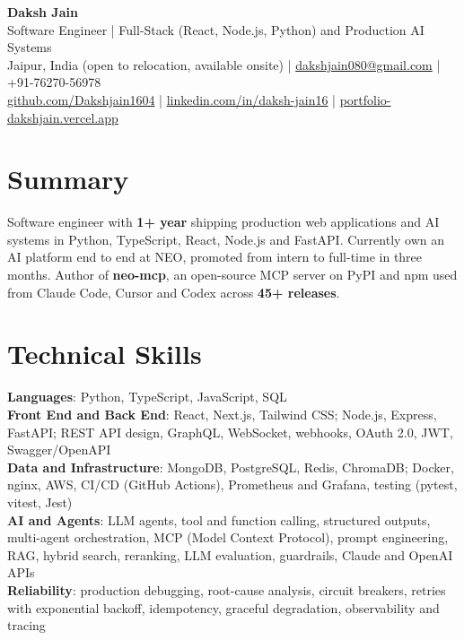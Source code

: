 \documentclass[10pt,letterpaper]{article}
\begin{document}
\begin{center}
  {\LARGE\bfseries Daksh Jain}\\[1pt]
  Software Engineer | Full-Stack (React, Node.js, Python) and Production AI Systems\\[1pt]
  Jaipur, India (open to relocation, available onsite) |
  \href{mailto:dakshjain080@gmail.com}{dakshjain080@gmail.com} |
  +91-76270-56978\\[1pt]
  \href{https://github.com/Dakshjain1604}{github.com/Dakshjain1604} |
  \href{https://linkedin.com/in/daksh-jain16}{linkedin.com/in/daksh-jain16} |
  \href{https://portfolio-dakshjain.vercel.app}{portfolio-dakshjain.vercel.app}
\end{center}

\section*{Summary}

Software engineer with \textbf{1+ year} shipping production web applications and AI systems in
Python, TypeScript, React, Node.js and FastAPI. Currently own an AI platform end to end at NEO,
promoted from intern to full-time in three months. Author of \textbf{neo-mcp}, an open-source
MCP server on PyPI and npm used from Claude Code, Cursor and Codex across \textbf{45+ releases}.

\section*{Technical Skills}

\textbf{Languages}: Python, TypeScript, JavaScript, SQL\\[1pt]
\textbf{Front End and Back End}: React, Next.js, Tailwind CSS; Node.js, Express, FastAPI;
REST API design, GraphQL, WebSocket, webhooks, OAuth 2.0, JWT, Swagger/OpenAPI\\[1pt]
\textbf{Data and Infrastructure}: MongoDB, PostgreSQL, Redis, ChromaDB; Docker, nginx, AWS,
CI/CD (GitHub Actions), Prometheus and Grafana, testing (pytest, vitest, Jest)\\[1pt]
\textbf{AI and Agents}: LLM agents, tool and function calling, structured outputs, multi-agent
orchestration, MCP (Model Context Protocol), prompt engineering, RAG, hybrid search, reranking,
LLM evaluation, guardrails, Claude and OpenAI APIs\\[1pt]
\textbf{Reliability}: production debugging, root-cause analysis, circuit breakers, retries with
exponential backoff, idempotency, graceful degradation, observability and tracing
\end{document}
